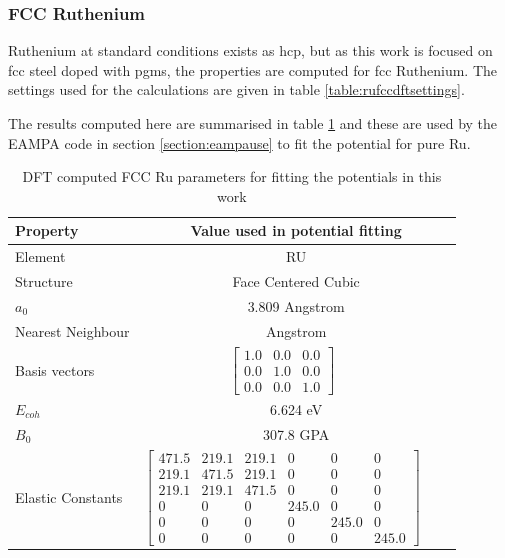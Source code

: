 \FloatBarrier
\subsubsection{FCC Ruthenium}
\label{section:fccferesults}

Ruthenium at standard conditions exists as \acrlong{hcp}, but as this work is focused on \acrshort{fcc} steel doped with \acrshort{pgm}s, the properties are computed for \acrshort{fcc} Ruthenium.  The settings used for the calculations are given in table \ref{table:rufccdftsettings}. 

The results computed here are summarised in table \ref{table:ruinputparameters} and these are used by the EAMPA code in section \ref{section:eampause} to fit the potential for pure \Gls{Ru}.

\begin{table}[h]
\renewcommand{\arraystretch}{1.2}
\centering
\begin{tabular}{lccc}
\hline\hline
Property & \multicolumn{3}{c}{Value used in potential fitting} \\
\hline\hline
Element & \multicolumn{3}{c}{RU}\\
Structure             & \multicolumn{3}{c}{Face Centered Cubic}\\
$a_0$                 & \multicolumn{3}{c}{3.809 Angstrom \cite{webelementspd}}\\
Nearest Neighbour     & \multicolumn{3}{c}{ Angstrom \cite{webelementspd}}\\
Basis vectors         & $\begin{bmatrix} 1.0 & 0.0 & 0.0 \\ 0.0 & 1.0 & 0.0 \\ 0.0 & 0.0 & 1.0  \end{bmatrix}$ \\
$E_{coh}$             & \multicolumn{3}{c}{6.624 eV \cite{semiempiricalpots}}   \\
$B_0$                 & \multicolumn{3}{c}{307.8 GPA \cite{semiempiricalpots}}   \\
Elastic Constants     & $\begin{bmatrix} 471.5 & 219.1 & 219.1 & 0 & 0 & 0 \\ 219.1 & 471.5 & 219.1 & 0 & 0 & 0 \\ 219.1 & 219.1 & 471.5 & 0 & 0 & 0 \\ 0 & 0 & 0 & 245.0 & 0 & 0 \\ 0 & 0 & 0 & 0 & 245.0 & 0 \\ 0 & 0 & 0 & 0 & 0 & 245.0 \end{bmatrix}$ \\
\hline\hline
\end{tabular}
\caption{DFT computed FCC Ru parameters for fitting the potentials in this work}
\label{table:ruinputparameters}
\end{table}



